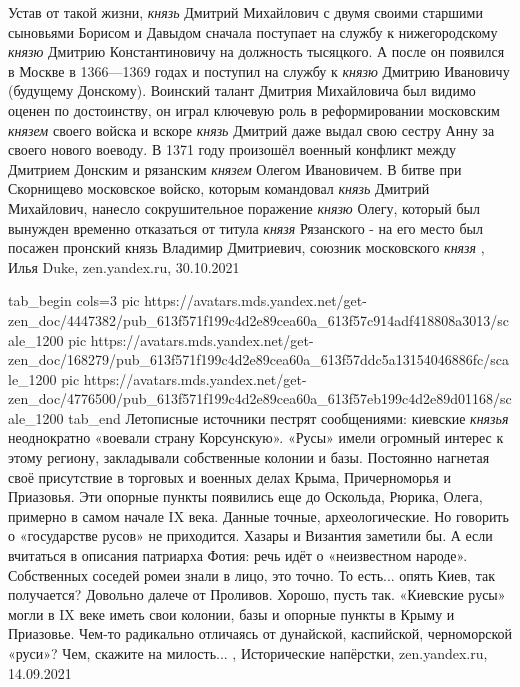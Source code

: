 Устав от такой жизни, \emph{князь} Дмитрий Михайлович с двумя своими старшими
сыновьями Борисом и Давыдом сначала поступает на службу к нижегородскому \emph{князю}
Дмитрию Константиновичу на должность тысяцкого. А после он появился в Москве в
1366—1369 годах и поступил на службу к \emph{князю} Дмитрию Ивановичу (будущему
Донскому). Воинский талант Дмитрия Михайловича был видимо оценен по
достоинству, он играл ключевую роль в реформировании московским \emph{князем} своего
войска и вскоре \emph{князь} Дмитрий даже выдал свою сестру Анну за своего нового
воеводу.  В 1371 году произошёл военный конфликт между Дмитрием Донским и
рязанским \emph{князем} Олегом Ивановичем. В битве при Скорнищево московское войско,
которым командовал \emph{князь} Дмитрий Михайлович, нанесло сокрушительное поражение
\emph{князю} Олегу, который был вынужден временно отказаться от титула \emph{князя}
Рязанского - на его место был посажен пронский князь Владимир Дмитриевич,
союзник московского \emph{князя}
, Илья Duke, zen.yandex.ru, 30.10.2021

\ifcmt
  tab_begin cols=3
     pic https://avatars.mds.yandex.net/get-zen_doc/4447382/pub_613f571f199c4d2e89cea60a_613f57c914adf418808a3013/scale_1200
     pic https://avatars.mds.yandex.net/get-zen_doc/168279/pub_613f571f199c4d2e89cea60a_613f57ddc5a13154046886fc/scale_1200
		 pic https://avatars.mds.yandex.net/get-zen_doc/4776500/pub_613f571f199c4d2e89cea60a_613f57eb199c4d2e89d01168/scale_1200
  tab_end
\fi
Летописные источники пестрят сообщениями: киевские \emph{князья} неоднократно «воевали
страну Корсунскую». «Русы» имели огромный интерес к этому региону, закладывали
собственные колонии и базы. Постоянно нагнетая своё присутствие в торговых и
военных делах Крыма, Причерноморья и Приазовья. Эти опорные пункты появились
еще до Оскольда, Рюрика, Олега, примерно в самом начале IX века. Данные точные,
археологические. Но говорить о «государстве русов» не приходится. Хазары и
Византия заметили бы.  А если вчитаться в описания патриарха Фотия: речь идёт о
«неизвестном народе».  Собственных соседей ромеи знали в лицо, это точно. То
есть... опять Киев, так получается? Довольно далече от Проливов. Хорошо, пусть
так. «Киевские русы» могли в IX веке иметь свои колонии, базы и опорные пункты
в Крыму и Приазовье.  Чем-то радикально отличаясь от дунайской, каспийской,
черноморской «руси»? Чем, скажите на милость...
, 
Исторические напёрстки, zen.yandex.ru, 14.09.2021

